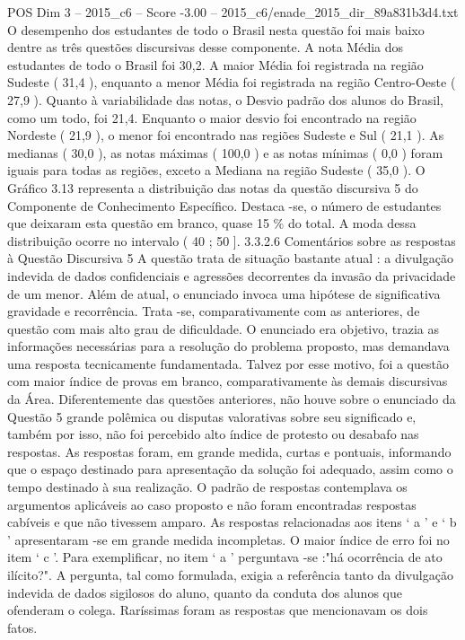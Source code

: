 \begin{textsample}{POS Dim 3 – 2015\_c6 – Score -3.00 – 2015\_c6/enade\_2015\_dir\_89a831b3d4.txt}
O desempenho dos estudantes de todo o Brasil nesta questão foi mais baixo dentre as três questões discursivas desse componente.
A nota Média dos estudantes de todo o Brasil foi 30,2.
A maior Média foi registrada na região Sudeste ( 31,4 ), enquanto a menor Média foi registrada na região Centro-Oeste ( 27,9 ).
Quanto à variabilidade das notas, o Desvio padrão dos alunos do Brasil, como um todo, foi 21,4.
Enquanto o maior desvio foi encontrado na região Nordeste ( 21,9 ), o menor foi encontrado nas regiões Sudeste e Sul ( 21,1 ).
As medianas ( 30,0 ), as notas máximas ( 100,0 ) e as notas mínimas ( 0,0 ) foram iguais para todas as regiões, exceto a Mediana na região Sudeste ( 35,0 ).
O Gráfico 3.13 representa a distribuição das notas da questão discursiva 5 do Componente de Conhecimento Específico.
Destaca -se, o número de estudantes que deixaram esta questão em branco, quase 15 \% do total.
A moda dessa distribuição ocorre no intervalo ( 40 ; 50 ]. 3.3.2.6 Comentários sobre as respostas à Questão Discursiva 5 A questão trata de situação bastante atual : a divulgação indevida de dados confidenciais e agressões decorrentes da invasão da privacidade de um menor.
Além de atual, o enunciado invoca uma hipótese de significativa gravidade e recorrência.
Trata -se, comparativamente com as anteriores, de questão com mais alto grau de dificuldade.
O enunciado era objetivo, trazia as informações necessárias para a resolução do problema proposto, mas demandava uma resposta tecnicamente fundamentada.
Talvez por esse motivo, foi a questão com maior índice de provas em branco, comparativamente às demais discursivas da Área.
Diferentemente das questões anteriores, não houve sobre o enunciado da Questão 5 grande polêmica ou disputas valorativas sobre seu significado e, também por isso, não foi percebido alto índice de protesto ou desabafo nas respostas.
As respostas foram, em grande medida, curtas e pontuais, informando que o espaço destinado para apresentação da solução foi adequado, assim como o tempo destinado à sua realização.
O padrão de respostas contemplava os argumentos aplicáveis ao caso proposto e não foram encontradas respostas cabíveis e que não tivessem amparo.
As respostas relacionadas aos itens ‘ a ’ e ‘ b ’ apresentaram -se em grande medida incompletas.
O maior índice de erro foi no item ‘ c ’.
Para exemplificar, no item ‘ a ’ perguntava -se :"há ocorrência de ato ilícito?".
A pergunta, tal como formulada, exigia a referência tanto da divulgação indevida de dados sigilosos do aluno, quanto da conduta dos alunos que ofenderam o colega.
Raríssimas foram as respostas que mencionavam os dois fatos.

\end{textsample}
